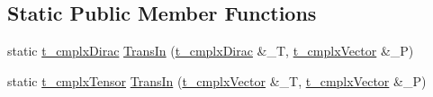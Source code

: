 \subsection*{Static Public Member Functions}
\begin{DoxyCompactItemize}
\item 
static \hyperlink{types_8h_ae924474dbd8b75d3e13a2674c4a06787}{t\-\_\-cmplx\-Dirac} \hyperlink{class_c___kinematics__1loop_a1c48f6d8a4aa9122d17f91d1d96f2be6}{Trans\-In} (\hyperlink{types_8h_ae924474dbd8b75d3e13a2674c4a06787}{t\-\_\-cmplx\-Dirac} \&\-\_\-\-T, \hyperlink{types_8h_ae8d0d77d0edff801ba45e425c85cf87d}{t\-\_\-cmplx\-Vector} \&\-\_\-\-P)
\item 
static \hyperlink{types_8h_a23430de2ae483000af45037b36fedba8}{t\-\_\-cmplx\-Tensor} \hyperlink{class_c___kinematics__1loop_ae0a061faae993061d6f3a3a9cecffca2}{Trans\-In} (\hyperlink{types_8h_ae8d0d77d0edff801ba45e425c85cf87d}{t\-\_\-cmplx\-Vector} \&\-\_\-\-T, \hyperlink{types_8h_ae8d0d77d0edff801ba45e425c85cf87d}{t\-\_\-cmplx\-Vector} \&\-\_\-\-P)
\end{DoxyCompactItemize}
